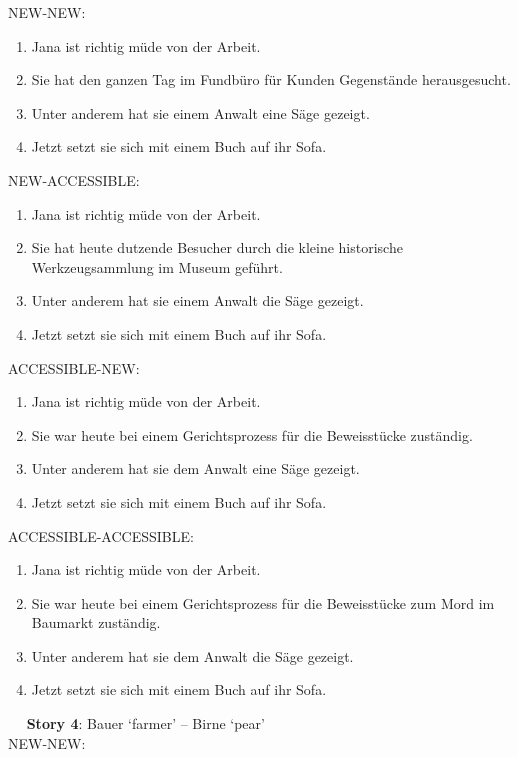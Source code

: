 NEW-NEW:

\begin{enumerate}
\item Jana ist richtig müde von der Arbeit.
\item Sie hat den ganzen Tag im Fundbüro für Kunden Gegenstände herausgesucht.
\item Unter anderem hat sie einem Anwalt eine Säge gezeigt.
\item Jetzt setzt sie sich mit einem Buch auf ihr Sofa.
\end{enumerate}

NEW-ACCESSIBLE:

\begin{enumerate}
\item Jana ist richtig müde von der Arbeit.
\item Sie hat heute dutzende Besucher durch die kleine historische Werkzeugsammlung im Museum geführt.
\item Unter anderem hat sie einem Anwalt die Säge gezeigt.
\item Jetzt setzt sie sich mit einem Buch auf ihr Sofa.
\end{enumerate}

ACCESSIBLE-NEW:

\begin{enumerate}
\item Jana ist richtig müde von der Arbeit.
\item Sie war heute bei einem Gerichtsprozess für die Beweisstücke zuständig.
\item Unter anderem hat sie dem Anwalt eine Säge gezeigt.
\item Jetzt setzt sie sich mit einem Buch auf ihr Sofa.
\end{enumerate}

ACCESSIBLE-ACCESSIBLE:

\begin{enumerate}
\item Jana ist richtig müde von der Arbeit.
\item Sie war heute bei einem Gerichtsprozess für die Beweisstücke zum Mord im Baumarkt zuständig.
\item Unter anderem hat sie dem Anwalt die Säge gezeigt.
\item Jetzt setzt sie sich mit einem Buch auf ihr Sofa.
\end{enumerate}
 
\textbf{Story 4}: Bauer `farmer' – Birne `pear'\\

NEW-NEW:

